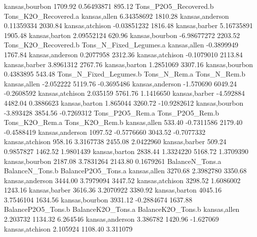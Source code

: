 \documentclass{report}
\begin{document}
\begin{Schunk}
\begin{Soutput}
kansas,bourbon             1709.92         0.56493871                895.12
                Tons_P2O5_Recovered.b Tons_K2O_Recovered.a
kansas,allen               6.34358692              1810.28
kansas,anderson            0.11359334              2030.84
kansas,atchison           -0.03851232              1816.48
kansas,barber              5.16735891              1905.48
kansas,barton              2.09552124               620.96
kansas,bourbon            -6.98677272              2203.52
                Tons_K2O_Recovered.b Tons_N_Fixed_Legumes.a
kansas,allen              -0.3899949                1767.84
kansas,anderson            0.2077958                2312.36
kansas,atchison           -0.1079010                2113.84
kansas,barber              3.8961312                2767.76
kansas,barton              1.2851069                3307.16
kansas,bourbon             0.4383895                 543.48
                Tons_N_Fixed_Legumes.b Tons_N_Rem.a Tons_N_Rem.b
kansas,allen                 -2.052222      5119.76   -0.3695486
kansas,anderson              -1.570690      6049.24   -0.2608592
kansas,atchison               2.035159      5761.76    1.1416650
kansas,barber                -4.592884      4482.04    0.3886623
kansas,barton                 1.865044      3260.72  -10.9282612
kansas,bourbon               -3.893428      3854.56   -0.7269312
                Tons_P2O5_Rem.a Tons_P2O5_Rem.b Tons_K2O_Rem.a Tons_K2O_Rem.b
kansas,allen             533.40      -0.7311586        2179.40     -0.4588419
kansas,anderson         1097.52      -0.5776660        3043.52     -0.7077332
kansas,atchison          958.16       3.3167738        2455.08      2.0422960
kansas,barber            509.24       0.9857827        1462.52      1.9801439
kansas,barton           2838.44       1.3324220        5168.72      1.3709390
kansas,bourbon          2187.08       3.7831264        2143.80      0.1679261
                BalanceN_Tons.a BalanceN_Tons.b BalanceP2O5_Tons.a
kansas,allen            3270.68       2.3982780            3350.68
kansas,anderson         3444.00       3.7979094            3447.52
kansas,atchison         3298.52       1.6086002            1243.16
kansas,barber           3616.36       3.2070922            3380.92
kansas,barton           4045.16       3.7546104            1634.56
kansas,bourbon          3931.12      -0.2884674            1637.88
                BalanceP2O5_Tons.b BalanceK2O_Tons.a BalanceK2O_Tons.b
kansas,allen              2.203732           1134.32          6.264546
kansas,anderson           3.386782           1420.96         -1.627069
kansas,atchison           2.105924           1108.40          3.311079

\end{Soutput}
\end{Schunk}
\end{document}
